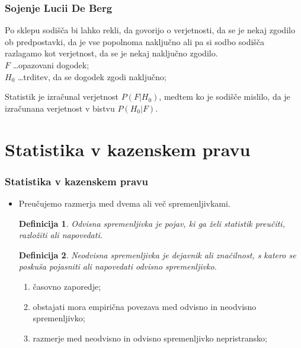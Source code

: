 \documentclass{beamer}
\newtheorem{definicija}{Definicija}
\begin{document}
\begin{frame}
   \frametitle{Sojenje Lucii De Berg}
   Po sklepu sodišča bi lahko rekli, da govorijo o verjetnosti, da se je nekaj zgodilo ob predpostavki, da je vse popolnoma naključno ali 
   pa si sodbo sodišča razlagamo kot verjetnost, da se je nekaj naključno zgodilo. \\ \vspace{4mm}
  $F$ \dots opazovani dogodek;\\
  $H_0$ \dots trditev, da se dogodek zgodi naključno;\\ \vspace{3mm}
  \begin{block}{}
   Statistik je izračunal verjetnost $P(F \lvert H_0)$, medtem ko je sodišče mislilo, da je izračunana  verjetnost v bistvu $P(H_0 \lvert F)$.
  \end{block}
\end{frame}
\section{Statistika v kazenskem pravu}

\begin{frame}
    \frametitle{Statistika v kazenskem pravu}
    \begin{itemize}
        \item Preučujemo razmerja med dvema ali več spremenljivkami.\\ \vspace{2mm}
         \begin{definicija}
            \textit{Odvisna spremenljivka} je pojav, ki ga želi statistik preučiti, razložiti ali napovedati.
        \end{definicija}
        \begin{definicija}
            \textit{Neodvisna spremenljivka} je dejavnik ali značilnost, s katero se poskuša pojasniti ali napovedati odvisno spremenljivko.
        \end{definicija}        
        \begin{enumerate}
            \item časovno zaporedje;
            \item obstajati mora empirična povezava med odvisno in neodvisno spremenljivko;
            \item razmerje med neodvisno in odvisno spremenljivko nepristransko;
        \end{enumerate}
    \end{itemize}
\end{frame}
\end{document}
